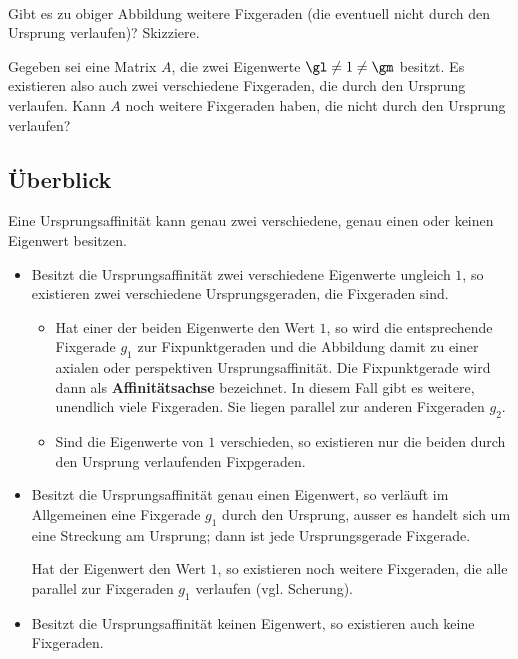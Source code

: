 \documentclass[%
11pt,%
twoside,%
titlepage,%
german,%
headsepline%
]{scrartcl}
\begin{document}
\begin{description}
\end{description}

\begin{ueb}
\ \\[-4ex]
\begin{enumeratea}
\item Gibt es zu obiger Abbildung weitere Fixgeraden (die eventuell nicht durch den Ursprung verlaufen)? Skizziere.
\item Gegeben sei eine Matrix $A$, die zwei Eigenwerte $\gl\neq1\neq\gm$ besitzt. Es existieren also auch zwei verschiedene Fixgeraden, die durch den Ursprung verlaufen. Kann $A$ noch weitere Fixgeraden haben, die nicht durch den Ursprung verlaufen?
\end{enumeratea}
\end{ueb}

\subsection{\"Uberblick}
Eine Ursprungsaffinität kann genau zwei verschiedene, genau einen oder keinen Eigenwert besitzen.
\begin{itemize}
\item Besitzt die Ursprungsaffinität zwei verschiedene Eigenwerte ungleich $1$, so existieren zwei verschiedene Ursprungsgeraden, die Fixgeraden sind.
\begin{itemize}
\item Hat einer der beiden Eigenwerte den Wert $1$, so wird die entsprechende Fixgerade $g_1$ zur Fixpunktgeraden und die Abbildung damit zu einer axialen oder perspektiven Ursprungsaffinität. Die Fixpunktgerade wird dann als \textbf{Affinitätsachse} bezeichnet. In diesem Fall gibt es weitere, unendlich viele Fixgeraden. Sie liegen parallel zur anderen Fixgeraden $g_2$.
\item Sind die Eigenwerte von $1$ verschieden, so existieren nur die beiden durch den Ursprung verlaufenden Fixpgeraden.
\end{itemize}
\item Besitzt die Ursprungsaffinität genau einen Eigenwert, so verläuft im Allgemeinen eine Fixgerade $g_1$ durch den Ursprung, ausser es handelt sich um eine Streckung am Ursprung; dann ist jede Ursprungsgerade Fixgerade.

Hat der Eigenwert den Wert $1$, so existieren noch weitere Fixgeraden, die alle parallel zur Fixgeraden $g_1$ verlaufen (vgl. Scherung).
\item Besitzt die Ursprungsaffinität keinen Eigenwert, so existieren auch keine Fixgeraden.
\end{itemize}
\end{document}

